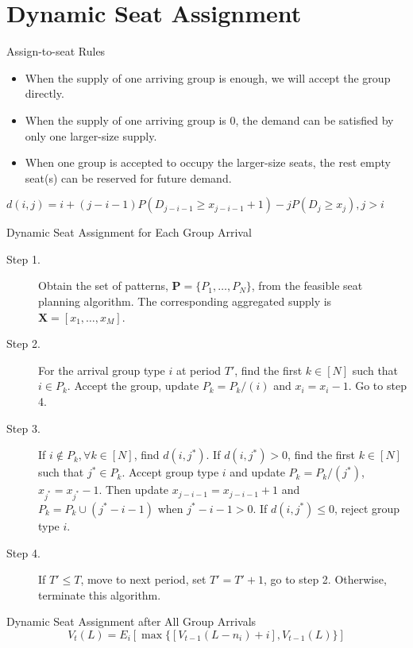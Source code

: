 
\section{Dynamic Seat Assignment}
    \frame{\sectionpage}

    \begin{frame}{Assign-to-seat Rules}
        \begin{itemize}
          \item When the supply of one arriving group is enough, we will accept the group directly.
          \item When the supply of one arriving group is 0, the demand can be satisfied by only one larger-size supply.
          \item When one group is accepted to occupy the larger-size seats, the rest empty seat(s) can be reserved for future demand.
      \end{itemize}
        $d(i,j) = i + (j-i-1)P(D_{j-i-1} \geq x_{j-i-1}+1) - j P(D_{j} \geq x_{j}), j >i$
      \end{frame}

    \begin{frame}{Dynamic Seat Assignment for Each Group Arrival}
        \begin{description}
          \item[Step 1.] Obtain the set of patterns, $\mathbf{P} = \{P_1,\ldots,P_{N}\}$, from the feasible seat planning algorithm. The corresponding aggregated supply is $\mathbf{X} = [x_{1}, \ldots, x_{M}]$.
          \item[Step 2.] For the arrival group type $i$ at period $T{'}$, find the first $k \in [N]$ such that $i \in P_k$. Accept the group, update $P_{k} = P_{k}/(i)$ and $x_{i} = x_{i} -1$. Go to step 4.
          \item[Step 3.] If $i \notin P_k, \forall k \in [N]$, find $d(i,j^{*})$. If $d(i,j^{*})>0$, find the first $k \in [N]$ such that $j^{*} \in P_k$. Accept group type $i$ and update $P_{k} = P_{k}/(j^{*})$, $x_{j^{*}} = x_{j^{*}} -1$. Then update $x_{j-i-1} = x_{j-i-1} + 1$ and $P_{k}= P_{k} \cup (j^{*}-i-1)$ when $j^{*}-i-1 > 0$. If $d(i,j^{*}) \leq 0$, reject group type $i$.
          \item[Step 4.] If $T{'} \leq T$, move to next period, set $T{'} = T{'}+1$, go to step 2. Otherwise, terminate this algorithm.
        \end{description}
      \end{frame}
      
      \begin{frame}{Dynamic Seat Assignment after All Group Arrivals}
        $$V_{t}(L) = E_{i} [\max\{ {[V_{t-1}(L-n_i)+ i]}, {V_{t-1}(L)}\}]$$
         
      \end{frame}
      